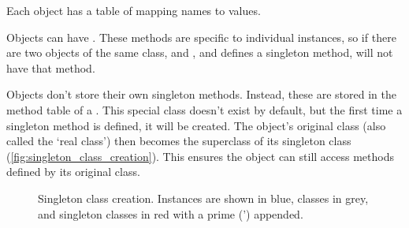 Each object has a table of  mapping names to values.

Objects can have . These methods are specific to individual instances, so if there are two objects of the same class,  and , and  defines a singleton method,  will not have that method.

Objects don't store their own singleton methods. Instead, these are stored in the method table of a . This special class doesn't exist by default, but the first time a singleton method is defined, it will be created. The object's original class (also called the `real class') then becomes the superclass of its singleton class (\autoref{fig:singleton_class_creation}). This ensures the object can still access methods defined by its original class.

\begin{figure}
\begin{center}
\caption{Singleton class creation. Instances are shown in blue, classes in grey, and singleton classes in red with a prime (') appended.}
\label{fig:singleton_class_creation}
\end{center}
\end{figure}

